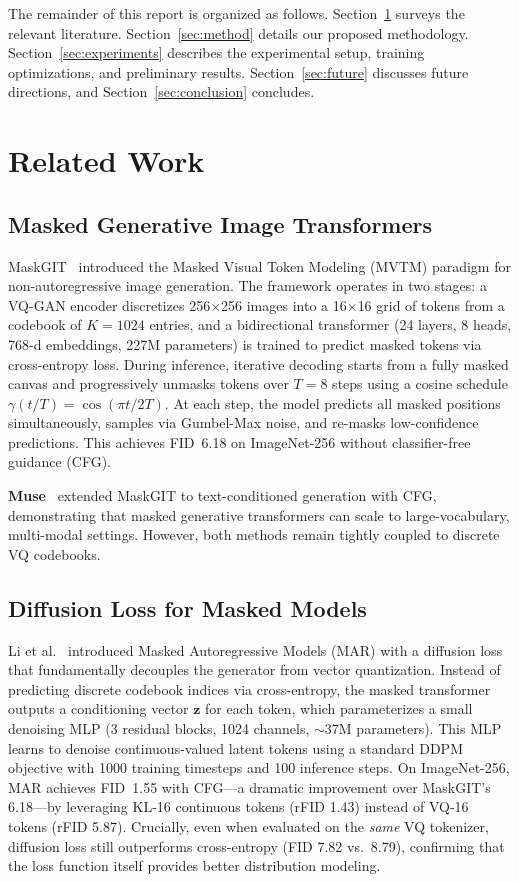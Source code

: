 \documentclass[conference]{IEEEtran}
\begin{document}
The remainder of this report is organized as follows. Section~\ref{sec:related} surveys the relevant literature. Section~\ref{sec:method} details our proposed methodology. Section~\ref{sec:experiments} describes the experimental setup, training optimizations, and preliminary results. Section~\ref{sec:future} discusses future directions, and Section~\ref{sec:conclusion} concludes.


\section{Related Work}
\label{sec:related}

\subsection{Masked Generative Image Transformers}

MaskGIT~\cite{chang2022maskgit} introduced the Masked Visual Token Modeling (MVTM) paradigm for non-autoregressive image generation. The framework operates in two stages: a VQ-GAN encoder discretizes 256$\times$256 images into a 16$\times$16 grid of tokens from a codebook of $K{=}1024$ entries, and a bidirectional transformer (24 layers, 8 heads, 768-d embeddings, 227M parameters) is trained to predict masked tokens via cross-entropy loss. During inference, iterative decoding starts from a fully masked canvas and progressively unmasks tokens over $T{=}8$ steps using a cosine schedule $\gamma(t/T) = \cos(\pi t / 2T)$. At each step, the model predicts all masked positions simultaneously, samples via Gumbel-Max noise, and re-masks low-confidence predictions. This achieves FID~6.18 on ImageNet-256 without classifier-free guidance (CFG).

\textbf{Muse}~\cite{chang2023muse} extended MaskGIT to text-conditioned generation with CFG, demonstrating that masked generative transformers can scale to large-vocabulary, multi-modal settings. However, both methods remain tightly coupled to discrete VQ codebooks.

\subsection{Diffusion Loss for Masked Models}

Li et al.~\cite{li2024mar} introduced Masked Autoregressive Models (MAR) with a diffusion loss that fundamentally decouples the generator from vector quantization. Instead of predicting discrete codebook indices via cross-entropy, the masked transformer outputs a conditioning vector $\mathbf{z}$ for each token, which parameterizes a small denoising MLP (3 residual blocks, 1024 channels, $\sim$37M parameters). This MLP learns to denoise continuous-valued latent tokens using a standard DDPM objective with 1000 training timesteps and 100 inference steps. On ImageNet-256, MAR achieves FID~1.55 with CFG---a dramatic improvement over MaskGIT's 6.18---by leveraging KL-16 continuous tokens (rFID 1.43) instead of VQ-16 tokens (rFID 5.87). Crucially, even when evaluated on the \textit{same} VQ tokenizer, diffusion loss still outperforms cross-entropy (FID 7.82 vs.\ 8.79), confirming that the loss function itself provides better distribution modeling.
\end{document}
